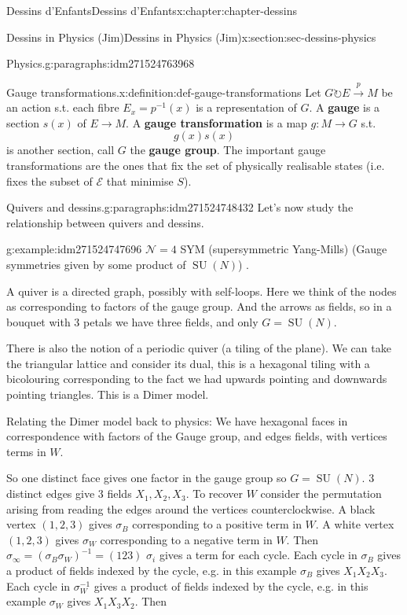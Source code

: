 \documentclass[oneside,10pt,]{book}
\newcommand{\terminology}[1]{\textbf{#1}}
\numberwithin{equation}{section}
\newcommand{\inv}{^{-1}}
\newcommand{\acts}{\circlearrowright}
\DeclareMathOperator{\specialunitary}{SU}
\begin{document}
\begin{chapterptx}{Dessins d'Enfants}{}{Dessins d'Enfants}{}{}{x:chapter:chapter-dessins}
\begin{sectionptx}{Dessins in Physics (Jim)}{}{Dessins in Physics (Jim)}{}{}{x:section:sec-dessins-physics}
\begin{paragraphs}{Physics.}{g:paragraphs:idm271524763968}
\begin{definition}{Gauge transformations.}{x:definition:def-gauge-transformations}
Let \(G \acts E \xrightarrow p M\) be an action s.t. each fibre \(E_x = p \inv(x)\) is a representation of \(G\). A \terminology{gauge} is a section \(s(x)\) of \(E \to M\). A \terminology{gauge transformation} is a map \(g\colon M \to G\) s.t.%
\begin{equation*}
g(x) s(x)
\end{equation*}
is another section, call \(G\) the \terminology{gauge group}. The important gauge transformations are the ones that fix the set of physically realisable states (i.e. fixes the subset of \(\mathcal E\) that minimise \(S\)).%
\end{definition}
\end{paragraphs}%
\begin{paragraphs}{Quivers and dessins.}{g:paragraphs:idm271524748432}%
Let's now study the relationship between quivers and dessins.%
\begin{example}{}{g:example:idm271524747696}%
\(\mathcal N = 4\) SYM (supersymmetric Yang-Mills) (Gauge symmetries given by some product of \(\specialunitary (N)\)) .%
\end{example}
A quiver is a directed graph, possibly with self-loops. Here we think of the nodes as corresponding to factors of the gauge group. And the arrows as fields, so in a bouquet with 3 petals we have three fields, and only \(G = \specialunitary (N)\).%
\par
There is also the notion of a periodic quiver (a tiling of the plane). We can take the triangular lattice and consider its dual, this is a hexagonal tiling with a bicolouring corresponding to the fact we had upwards pointing and downwards pointing triangles. This is a Dimer model.%
\par
Relating the Dimer model back to physics: We have hexagonal faces in correspondence with factors of the Gauge group, and edges fields, with vertices terms in \(W\).%
\par
So one distinct face gives one factor in the gauge group so \(G = \specialunitary (N)\). 3 distinct edges give 3 fields \(X_1, X_2, X_3\). To recover \(W\) consider the permutation arising from reading the edges around the vertices counterclockwise. A black vertex \((1,2,3)\) gives \(\sigma_B\) corresponding to a positive term in \(W\). A white vertex \((1,2,3)\) gives \(\sigma_W\) corresponding to a negative term in \(W\). Then \(\sigma_\infty = (\sigma_B\sigma_W)\inv = (123)\) \(\sigma_i\) gives a term for each cycle. Each cycle in \(\sigma_B\) gives a product of fields indexed by the cycle, e.g. in this example \(\sigma_B\) gives \(X_1X_2X_3\). Each cycle in \(\sigma_W\inv\) gives a product of fields indexed by the cycle, e.g. in this example \(\sigma_W\) gives \(X_1X_3X_2\). Then%

\end{paragraphs}
\end{sectionptx}
\end{chapterptx}
\end{document}
